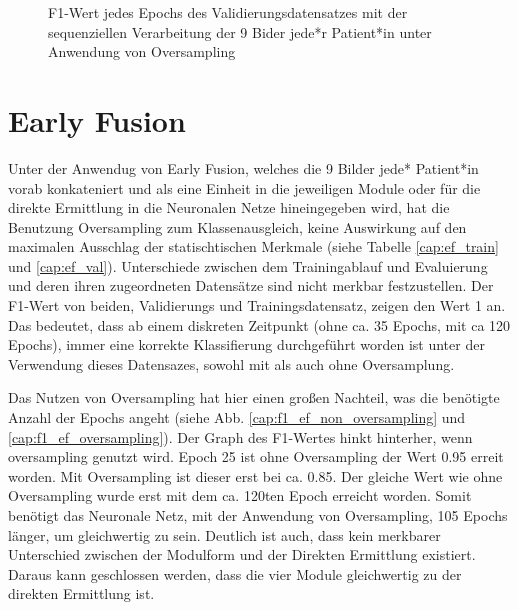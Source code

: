 \begin{figure}[b]\centering
\makebox[0pt]{}
\caption[F1-Wert jedes Epochs des Validierungsdatensatzes mit der sequenziellen Verarbeitung unter Anwendung von Oversampling]{F1-Wert jedes Epochs des Validierungsdatensatzes mit der sequenziellen Verarbeitung der 9 Bider jede*r Patient*in unter Anwendung von Oversampling}\label{cap:f1_sequential_oversampling}
\end{figure}\label{fig:f1_sequential_oversampling}





\clearpage
\section{Early Fusion}\label{earlyfusion}

Unter der Anwendug von Early Fusion, welches die 9 Bilder jede* Patient*in vorab konkateniert und als eine Einheit in die jeweiligen Module oder für die direkte Ermittlung in die Neuronalen Netze hineingegeben wird, hat die Benutzung Oversampling zum Klassenausgleich, keine Auswirkung auf den maximalen Ausschlag der statischtischen Merkmale (siehe Tabelle \ref{cap:ef_train} und \ref{cap:ef_val}). Unterschiede zwischen dem Trainingablauf und Evaluierung und deren ihren zugeordneten Datensätze sind nicht merkbar festzustellen. Der F1-Wert von beiden, Validierungs und Trainingsdatensatz, zeigen den Wert 1 an. Das bedeutet, dass ab einem diskreten Zeitpunkt (ohne ca. 35 Epochs, mit ca 120 Epochs), immer eine korrekte Klassifierung durchgeführt worden ist unter der Verwendung dieses Datensazes, sowohl mit als auch ohne Oversamplung.

Das Nutzen von Oversampling hat hier einen großen Nachteil, was die benötigte Anzahl der Epochs angeht (siehe Abb. \ref{cap:f1_ef_non_oversampling} und \ref{cap:f1_ef_oversampling}). Der Graph des F1-Wertes hinkt hinterher, wenn oversampling genutzt wird. Epoch 25 ist ohne Oversampling der Wert 0.95 erreit worden. Mit Oversampling ist dieser erst bei ca. 0.85. Der gleiche Wert wie ohne Oversampling wurde erst mit dem ca. 120ten Epoch erreicht worden. Somit benötigt das Neuronale Netz, mit der Anwendung von Oversampling, 105 Epochs länger, um gleichwertig zu sein. Deutlich ist auch, dass kein merkbarer Unterschied zwischen der Modulform und der Direkten Ermittlung existiert. Daraus kann geschlossen werden, dass die vier Module gleichwertig zu der direkten Ermittlung ist.

